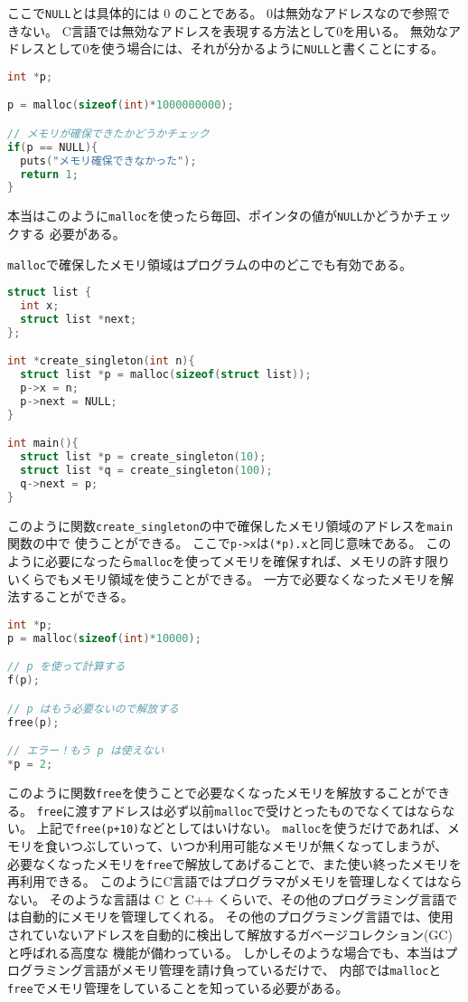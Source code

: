 \documentclass[a4paper,twoside,onecolumn,openany,article]{memoir}
\theoremstyle{remark}
\begin{document}
ここで\texttt{NULL}とは具体的には 0 のことである。
0は無効なアドレスなので参照できない。
C言語では無効なアドレスを表現する方法として0を用いる。
無効なアドレスとして0を使う場合には、それが分かるように\texttt{NULL}と書くことにする。
\begin{lstlisting}[basicstyle=\ttfamily\small,showstringspaces=false,language=C,frame=single]
int *p;

p = malloc(sizeof(int)*1000000000);

// メモリが確保できたかどうかチェック
if(p == NULL){
  puts("メモリ確保できなかった");
  return 1;
}

\end{lstlisting}
本当はこのように\texttt{malloc}を使ったら毎回、ポインタの値が\texttt{NULL}かどうかチェックする
必要がある。

\texttt{malloc}で確保したメモリ領域はプログラムの中のどこでも有効である。

\begin{lstlisting}[basicstyle=\ttfamily\small,showstringspaces=false,language=C,frame=single]
struct list {
  int x;
  struct list *next;
};

int *create_singleton(int n){
  struct list *p = malloc(sizeof(struct list));
  p->x = n;
  p->next = NULL;
}

int main(){
  struct list *p = create_singleton(10);
  struct list *q = create_singleton(100);
  q->next = p;
}
\end{lstlisting}
このように関数\texttt{create\_singleton}の中で確保したメモリ領域のアドレスを\texttt{main}関数の中で
使うことができる。
ここで\texttt{p->x}は\texttt{(*p).x}と同じ意味である。
このように必要になったら\texttt{malloc}を使ってメモリを確保すれば、メモリの許す限りいくらでもメモリ領域を使うことができる。
一方で必要なくなったメモリを解法することができる。

\begin{lstlisting}[basicstyle=\ttfamily\small,showstringspaces=false,language=C,frame=single]
int *p;
p = malloc(sizeof(int)*10000);

// p を使って計算する
f(p);

// p はもう必要ないので解放する
free(p);

// エラー！もう p は使えない
*p = 2;
\end{lstlisting}
このように関数\texttt{free}を使うことで必要なくなったメモリを解放することができる。
\texttt{free}に渡すアドレスは必ず以前\texttt{malloc}で受けとったものでなくてはならない。
上記で\texttt{free(p+10)}などとしてはいけない。
\texttt{malloc}を使うだけであれば、メモリを食いつぶしていって、いつか利用可能なメモリが無くなってしまうが、
必要なくなったメモリを\texttt{free}で解放してあげることで、また使い終ったメモリを再利用できる。
このようにC言語ではプログラマがメモリを管理しなくてはならない。
そのような言語は C と C++ くらいで、その他のプログラミング言語では自動的にメモリを管理してくれる。
その他のプログラミング言語では、使用されていないアドレスを自動的に検出して解放するガベージコレクション(GC)と呼ばれる高度な
機能が備わっている。
しかしそのような場合でも、本当はプログラミング言語がメモリ管理を請け負っているだけで、
内部では\texttt{malloc}と\texttt{free}でメモリ管理をしていることを知っている必要がある。
\end{document}
